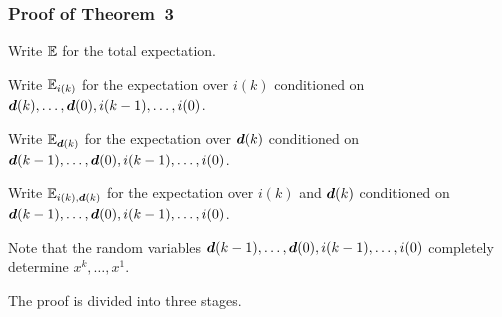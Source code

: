 \documentclass[10pt,mathserif]{beamer}
\begin{document}
\begin{frame}
\frametitle{Proof of Theorem~3}
Write ${\mathbb{E}}$ for the total expectation.
\vspace{0.1in}

Write ${\mathbb{E}}_{i(k)}$ for the expectation over $i(k)$ conditioned on $\boldsymbol{d}(k),\dots,\boldsymbol{d}(0),i(k-1),\dots,i(0)$.

\vspace{0.1in}


Write
${\mathbb{E}}_{\boldsymbol{d}(k)}$ for the expectation over $\boldsymbol{d}(k)$ conditioned on $\boldsymbol{d}(k-1),\dots,\boldsymbol{d}(0),i(k-1),\dots,i(0)$.

\vspace{0.1in}

Write ${\mathbb{E}}_{i(k),\boldsymbol{d}(k)}$ for the expectation over $i(k)$ and $\boldsymbol{d}(k)$ conditioned on $\boldsymbol{d}(k-1),\dots,\boldsymbol{d}(0),i(k-1),\dots,i(0)$.



\vspace{0.1in}

Note that the random variables $\boldsymbol{d}(k-1),\dots,\boldsymbol{d}(0),i(k-1),\dots,i(0)$ completely determine $x^{k},\dots,x^1$.

\bigskip

The proof is divided into three stages.

\end{frame}
\end{document}
